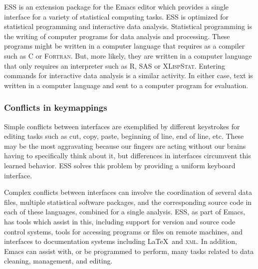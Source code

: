 \documentclass{article}
\newcommand*{\SAS}{\textsc{SAS}{\textregistered} }
\newcommand*{\XLispStat}{\textsc{XLispStat}}
\newcommand*{\Fortran}{\textsc{Fortran}}
\begin{document}
ESS is an extension package for
the Emacs editor which provides a single interface for a variety of
statistical computing tasks.  ESS is optimized for statistical programming
and interactive data analysis.  Statistical programming is the writing of
computer programs for data analysis and processing.  These programs might be
written in a computer language that requires as a compiler such as C or
\Fortran.  But, more likely, they are written in a  computer
language that only requires an interpreter such as R, \SAS or \XLispStat.
Entering commands for interactive data analysis is a similar activity.
In either case, text is written in a computer language and sent to a
computer program for evaluation.

\subsubsection{Conflicts in keymappings}
\label{sec:confl-keym}

Simple conflicts between interfaces are exemplified by different
keystrokes for editing tasks such as cut, copy, paste, beginning of
line, end of line, etc.  These may be the most aggravating
because our fingers are acting without our brains having to
specifically think about it, but differences in interfaces
circumvent this learned behavior.  ESS solves this problem by
providing a uniform keyboard interface.

Complex conflicts between interfaces can involve the coordination of
several data files, multiple statistical software packages, and the
corresponding source code in each of these languages, combined for a
single analysis.  ESS, as part of Emacs, has tools which assist in
this, including support for version and source code control systems,
tools for accessing programs or files on remote machines, and
interfaces to documentation systems including \LaTeX\ and
\textsc{xml}.  In addition, Emacs can assist with, or be programmed to
perform, many tasks related to data cleaning, management, and editing.
\end{document}
